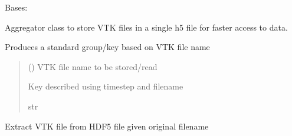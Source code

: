 \documentclass[letterpaper,10pt,english]{sphinxmanual}
\begin{document}
\begin{fulllineitems}
\label{\detokenize{pyfdempp:pyfdempp.aggregate_storage.aggregate_storage}}
\pysigstartsignatures
{}
\pysigstopsignatures
\sphinxAtStartPar
Bases: 

\sphinxAtStartPar
Aggregator class to store VTK files in a single h5 file for faster access to data.

\begin{fulllineitems}
\label{\detokenize{pyfdempp:pyfdempp.aggregate_storage.aggregate_storage.file_group_key}}
\pysigstartsignatures
{}
\pysigstopsignatures
\sphinxAtStartPar
Produces a standard group/key based on VTK file name
\begin{quote}\begin{description}
\sphinxAtStartPar
{} () \textendash{} VTK file name to be stored/read

\sphinxAtStartPar
Key described using timestep and filename

\sphinxAtStartPar
str

\end{description}\end{quote}

\end{fulllineitems}


\begin{fulllineitems}
\label{\detokenize{pyfdempp:pyfdempp.aggregate_storage.aggregate_storage.read_file}}
\pysigstartsignatures
{}
\pysigstopsignatures
\sphinxAtStartPar
Extract VTK file from HDF5 file given original filename


\end{fulllineitems}
\end{fulllineitems}
\end{document}
